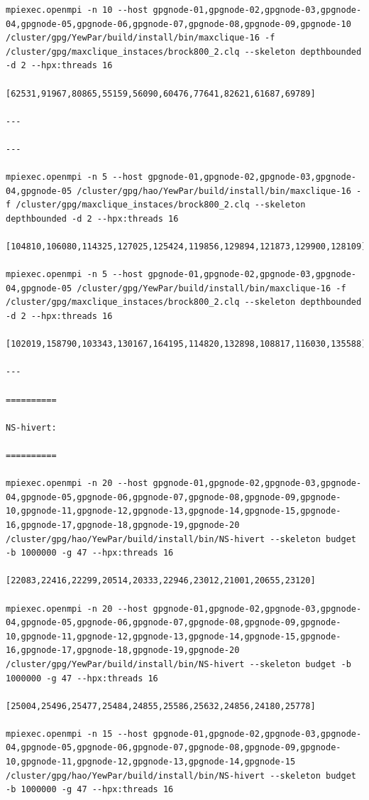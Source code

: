 \documentclass{mproj}
\begin{document}
\begin{lstlisting}
mpiexec.openmpi -n 10 --host gpgnode-01,gpgnode-02,gpgnode-03,gpgnode-04,gpgnode-05,gpgnode-06,gpgnode-07,gpgnode-08,gpgnode-09,gpgnode-10 /cluster/gpg/YewPar/build/install/bin/maxclique-16 -f /cluster/gpg/maxclique_instaces/brock800_2.clq --skeleton depthbounded -d 2 --hpx:threads 16

[62531,91967,80865,55159,56090,60476,77641,82621,61687,69789]

---

---

mpiexec.openmpi -n 5 --host gpgnode-01,gpgnode-02,gpgnode-03,gpgnode-04,gpgnode-05 /cluster/gpg/hao/YewPar/build/install/bin/maxclique-16 -f /cluster/gpg/maxclique_instaces/brock800_2.clq --skeleton depthbounded -d 2 --hpx:threads 16

[104810,106080,114325,127025,125424,119856,129894,121873,129900,128109]

mpiexec.openmpi -n 5 --host gpgnode-01,gpgnode-02,gpgnode-03,gpgnode-04,gpgnode-05 /cluster/gpg/YewPar/build/install/bin/maxclique-16 -f /cluster/gpg/maxclique_instaces/brock800_2.clq --skeleton depthbounded -d 2 --hpx:threads 16

[102019,158790,103343,130167,164195,114820,132898,108817,116030,135588]

---

==========

NS-hivert:

==========

mpiexec.openmpi -n 20 --host gpgnode-01,gpgnode-02,gpgnode-03,gpgnode-04,gpgnode-05,gpgnode-06,gpgnode-07,gpgnode-08,gpgnode-09,gpgnode-10,gpgnode-11,gpgnode-12,gpgnode-13,gpgnode-14,gpgnode-15,gpgnode-16,gpgnode-17,gpgnode-18,gpgnode-19,gpgnode-20 /cluster/gpg/hao/YewPar/build/install/bin/NS-hivert --skeleton budget -b 1000000 -g 47 --hpx:threads 16

[22083,22416,22299,20514,20333,22946,23012,21001,20655,23120]

mpiexec.openmpi -n 20 --host gpgnode-01,gpgnode-02,gpgnode-03,gpgnode-04,gpgnode-05,gpgnode-06,gpgnode-07,gpgnode-08,gpgnode-09,gpgnode-10,gpgnode-11,gpgnode-12,gpgnode-13,gpgnode-14,gpgnode-15,gpgnode-16,gpgnode-17,gpgnode-18,gpgnode-19,gpgnode-20 /cluster/gpg/YewPar/build/install/bin/NS-hivert --skeleton budget -b 1000000 -g 47 --hpx:threads 16

[25004,25496,25477,25484,24855,25586,25632,24856,24180,25778]

mpiexec.openmpi -n 15 --host gpgnode-01,gpgnode-02,gpgnode-03,gpgnode-04,gpgnode-05,gpgnode-06,gpgnode-07,gpgnode-08,gpgnode-09,gpgnode-10,gpgnode-11,gpgnode-12,gpgnode-13,gpgnode-14,gpgnode-15 /cluster/gpg/hao/YewPar/build/install/bin/NS-hivert --skeleton budget -b 1000000 -g 47 --hpx:threads 16


\end{lstlisting}
\end{document}
